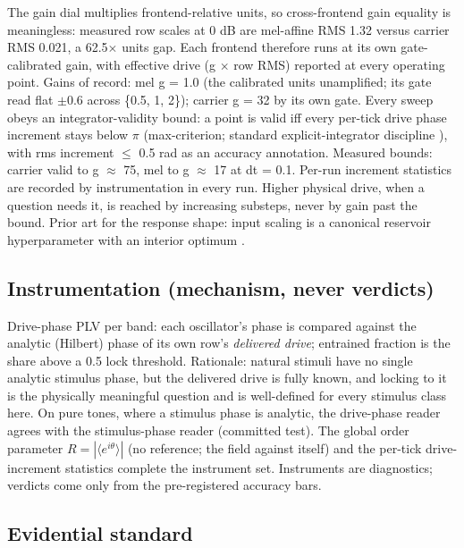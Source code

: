 \documentclass[10pt]{article}
\begin{document}
The gain dial multiplies frontend-relative units, so cross-frontend gain
equality is meaningless: measured row scales at 0 dB are mel-affine RMS
1.32 versus carrier RMS 0.021, a 62.5\ensuremath{\times} units gap. Each
frontend therefore runs at its own gate-calibrated gain, with effective
drive (g \ensuremath{\times} row RMS) reported at every operating point.
Gains of record: mel g = 1.0 (the calibrated units unamplified; its gate
read flat \ensuremath{\pm}0.6 across \{0.5, 1, 2\}); carrier g = 32 by
its own gate. Every sweep obeys an integrator-validity bound: a point is
valid iff every per-tick drive phase increment stays below
\ensuremath{\pi} (max-criterion; standard explicit-integrator discipline
\citep{hairer1993}), with rms increment \ensuremath{\leq} 0.5 rad as an
accuracy annotation. Measured bounds: carrier valid to g
\ensuremath{\approx} 75, mel to g \ensuremath{\approx} 17 at dt = 0.1.
Per-run increment statistics are recorded by instrumentation in every
run. Higher physical drive, when a question needs it, is reached by
increasing substeps, never by gain past the bound. Prior art for the
response shape: input scaling is a canonical reservoir hyperparameter
with an interior optimum \citep{lukosevicius2012}.

\subsection{Instrumentation (mechanism, never
verdicts)}\label{instrumentation-mechanism-never-verdicts}

Drive-phase PLV per band: each oscillator's phase is compared against
the analytic (Hilbert) phase of its own row's \emph{delivered drive};
entrained fraction is the share above a 0.5 lock threshold. Rationale:
natural stimuli have no single analytic stimulus phase, but the
delivered drive is fully known, and locking to it is the physically
meaningful question and is well-defined for every stimulus class here.
On pure tones, where a stimulus phase is analytic, the drive-phase
reader agrees with the stimulus-phase reader (committed test). The
global order parameter \(R = |\langle e^{i\theta}\rangle|\) (no
reference; the field against itself) and the per-tick drive-increment
statistics complete the instrument set. Instruments are diagnostics;
verdicts come only from the pre-registered accuracy bars.

\subsection{Evidential standard}\label{evidential-standard}
\end{document}
